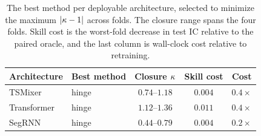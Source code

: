 \begin{table}[t]
\caption{The best method per deployable architecture, selected to
minimize the maximum $|\kappa-1|$ across folds. The closure range
spans the four folds. Skill cost is the worst-fold decrease in test IC
relative to the paired oracle, and the last column is wall-clock
cost relative to retraining.}
\label{tab:method_choice}
\centering
\footnotesize
\begin{tabular}{llccc}
\toprule
Architecture & Best method & Closure $\kappa$ & Skill cost & Cost \\
\midrule
TSMixer & hinge & $0.74$--$1.18$ & $0.004$ & $0.4\times$ \\
Transformer & hinge & $1.12$--$1.36$ & $0.011$ & $0.4\times$ \\
SegRNN & hinge & $0.44$--$0.79$ & $0.004$ & $0.2\times$ \\
\bottomrule
\end{tabular}
\end{table}
